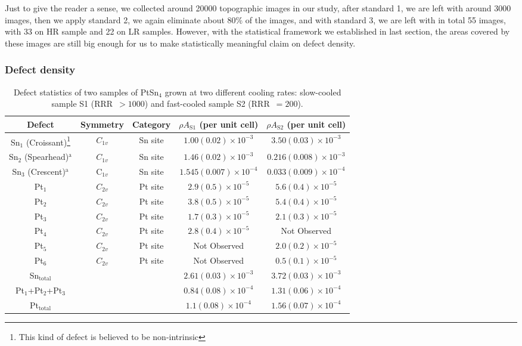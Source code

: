 Just to give the reader a sense, we collected around 20000 topographic images in our study, after standard 1, we are left with around 3000 images, then we apply standard 2, we again eliminate about 80\% of the images, and with standard 3, we are left with in total 55 images, with 33 on HR sample and 22 on LR samples. However, with the statistical framework we established in last section, the areas covered by these images are still big enough for us to make statistically meaningful claim on defect density.

\subsubsection{Defect density}


\begin{table*}
		\renewcommand{\arraystretch}{1.5}  %
		\caption{Defect statistics of two samples of PtSn$_4$ grown at two different cooling rates: slow-cooled sample S1 (RRR~$>1000$) and fast-cooled sample S2 (RRR~$=200$).} \label{tab:table1}
		\begin{tabular}{ccccc}
			Defect & Symmetry & Category & $\rho A_{\text{S1}}$ (per unit cell) & $\rho A_{\text{S2}}$ (per unit cell) \\ 
			\hline
			Sn$_1$ (Croissant)\footnote{This kind of defect is believed to be non-intrinsic} & $C_{1v}$ & Sn site & $1.00(0.02) \times 10^{-3}$ & $3.50(0.03) \times 10^{-3}$ \\
			Sn$_2$ (Spearhead)$^{\text{a}}$ & $C_{1v}$ & Sn site & $1.46(0.02) \times 10^{-3}$ & $0.216(0.008) \times 10^{-3}$ \\
			Sn$_3$ (Crescent)$^{\text{a}}$ & C$_{1v}$ & Sn site & $1.545(0.007) \times 10^{-4}$ & $0.033(0.009) \times 10^{-4}$ \\
			\hline
			Pt$_1$ & $C_{2v}$ & Pt site & $2.9(0.5) \times 10^{-5}$ & $5.6(0.4) \times 10^{-5}$ \\
			Pt$_2$ & $C_{2v}$ & Pt site & $3.8(0.5) \times 10^{-5}$ & $5.4(0.4) \times 10^{-5}$ \\
			Pt$_3$ & $C_{2v}$ & Pt site & $1.7(0.3) \times 10^{-5}$ & $2.1(0.3) \times 10^{-5}$ \\
			Pt$_4$ & $C_{2v}$ & Pt site & $2.8(0.4) \times 10^{-5}$ & Not Observed \\
			Pt$_5$ & $C_{2v}$ & Pt site & Not Observed & $2.0(0.2) \times 10^{-5}$ \\
			Pt$_6$ & $C_{2v}$ & Pt site & Not Observed & $0.5(0.1) \times 10^{-5}$ \\
			\hline
			Sn$_{\text{total}}$ &  &  & $2.61(0.03) \times 10^{-3}$ & $3.72(0.03) \times 10^{-3}$ \\
			Pt$_1$+Pt$_2$+Pt$_3$ &  &  & $0.84(0.08) \times 10^{-4}$ & $1.31(0.06) \times 10^{-4}$ \\
			Pt$_{\text{total}}$ &  &  & $1.1(0.08) \times 10^{-4}$ & $1.56(0.07) \times 10^{-4}$ \\
		\end{tabular}
\end{table*}

